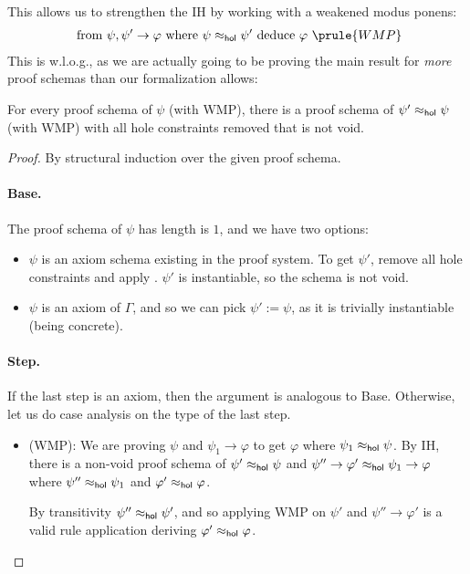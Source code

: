\documentclass{mgr}
\begin{document}
This allows us to strengthen the IH by working with a weakened modus ponens:
\begin{align*}
\text{ from }\psi, \psi' \to \varphi \text{ where }\psi \approx_\Hol \psi'\text { deduce } \varphi\ \prule{WMP}
\end{align*}
This is w.l.o.g., as we are actually going to be proving the main result for \emph{more} proof schemas than our formalization allows:
\begin{theorem*}[WIP]
  For every proof schema of $\psi$ (with WMP), there is a proof schema of $\psi' \approx_{\mathsf{hol}} \psi$ (with WMP) with all hole constraints removed that is not void.
  \begin{proof}
    By structural induction over the given proof schema.

    \paragraph{Base.} The proof schema of $\psi$ has length is $1$, and we have two options:
    \begin{itemize}
      \item $\psi$ is an axiom schema existing in the proof system.
      To get $\psi'$, remove all hole constraints and apply .
      $\psi'$ is instantiable, so the schema is not void.

      \item $\psi$ is an axiom of $\Gamma$, and so we can pick $\psi' := \psi$, as it is trivially instantiable (being concrete).
    \end{itemize}

    \paragraph{Step.} If the last step is an axiom, then the argument is analogous to Base.
    Otherwise, let us do case analysis on the type of the last step.

    \begin{itemize}
      \item (WMP): We are proving $\psi$ and $\psi_1 \to \varphi$ to get $\varphi$ where $\psi_1 \approx_{\mathsf{hol}} \psi$.
      By IH, there is a non-void proof schema of $\psi' \approx_{\mathsf{hol}} \psi$ and $\psi'' \to \varphi' \approx_{\mathsf{hol}} \psi_1 \to \varphi$ where $\psi'' \approx_{\mathsf{hol}} \psi_1$ and $\varphi' \approx_{\mathsf{hol}} \varphi$.

      By transitivity $\psi'' \approx_{\mathsf{hol}} \psi'$, and so applying WMP on $\psi'$ and $\psi'' \to \varphi'$ is a valid rule application deriving $\varphi' \approx_{\mathsf{hol}} \varphi$.


\end{itemize}
\end{proof}
\end{theorem*}
\end{document}

